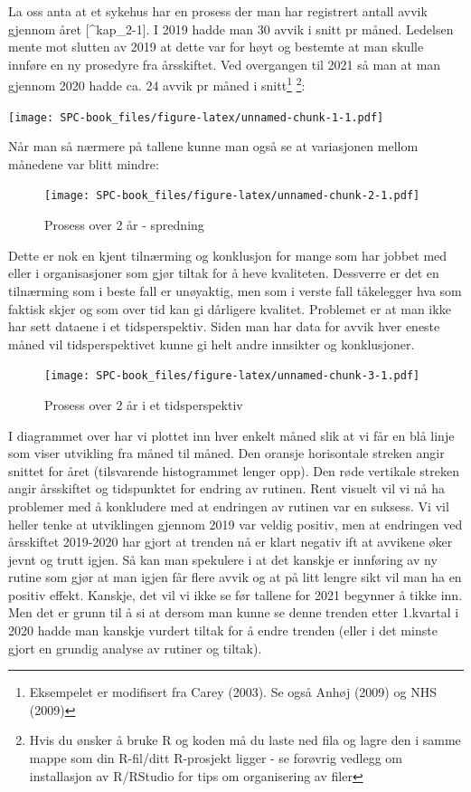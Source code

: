\documentclass[
]{book}
\begin{document}
La oss anta at et sykehus har en prosess der man har registrert antall avvik gjennom året {[}\^{}kap\_2-1{]}. I 2019 hadde man 30 avvik i snitt pr måned. Ledelsen mente mot slutten av 2019 at dette var for høyt og bestemte at man skulle innføre en ny prosedyre fra årsskiftet. Ved overgangen til 2021 så man at man gjennom 2020 hadde ca. 24 avvik pr måned i snitt\footnote{Eksempelet er modifisert fra Carey (2003). Se også Anhøj (2009) og NHS (2009)} \footnote{Hvis du ønsker å bruke R og koden må du laste ned fila og lagre den i samme mappe som din R-fil/ditt R-prosjekt ligger - se forøvrig vedlegg om installasjon av R/RStudio for tips om organisering av filer}:

\texttt{[image: SPC-book\_files/figure-latex/unnamed-chunk-1-1.pdf]}

Når man så nærmere på tallene kunne man også se at variasjonen mellom månedene var blitt mindre:

\begin{figure}
\centering
\texttt{[image: SPC-book\_files/figure-latex/unnamed-chunk-2-1.pdf]}
\caption{\label{fig:unnamed-chunk-2}Prosess over 2 år - spredning}
\end{figure}

Dette er nok en kjent tilnærming og konklusjon for mange som har jobbet med eller i organisasjoner som gjør tiltak for å heve kvaliteten. Dessverre er det en tilnærming som i beste fall er unøyaktig, men som i verste fall tåkelegger hva som faktisk skjer og som over tid kan gi dårligere kvalitet. Problemet er at man ikke har sett dataene i et tidsperspektiv. Siden man har data for avvik hver eneste måned vil tidsperspektivet kunne gi helt andre innsikter og konklusjoner.

\begin{figure}
\centering
\texttt{[image: SPC-book\_files/figure-latex/unnamed-chunk-3-1.pdf]}
\caption{\label{fig:unnamed-chunk-3}Prosess over 2 år i et tidsperspektiv}
\end{figure}

I diagrammet over har vi plottet inn hver enkelt måned slik at vi får en blå linje som viser utvikling fra måned til måned. Den oransje horisontale streken angir snittet for året (tilsvarende histogrammet lenger opp). Den røde vertikale streken angir årsskiftet og tidspunktet for endring av rutinen. Rent visuelt vil vi nå ha problemer med å konkludere med at endringen av rutinen var en suksess. Vi vil heller tenke at utviklingen gjennom 2019 var veldig positiv, men at endringen ved årsskiftet 2019-2020 har gjort at trenden nå er klart negativ ift at avvikene øker jevnt og trutt igjen. Så kan man spekulere i at det kanskje er innføring av ny rutine som gjør at man igjen får flere avvik og at på litt lengre sikt vil man ha en positiv effekt. Kanskje, det vil vi ikke se før tallene for 2021 begynner å tikke inn. Men det er grunn til å si at dersom man kunne se denne trenden etter 1.kvartal i 2020 hadde man kanskje vurdert tiltak for å endre trenden (eller i det minste gjort en grundig analyse av rutiner og tiltak).
\end{document}
